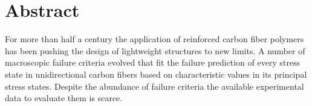 \chapter*{Abstract}

For more than half a century the application of reinforced carbon fiber polymers has been pushing the design of lightweight structures to new limits. A number of macroscopic failure criteria evolved that fit the failure prediction of every stress state in unidirectional carbon fibers based on characteristic values in its principal stress states. Despite the abundance of failure criteria the available experimental data to evaluate them is scarce.